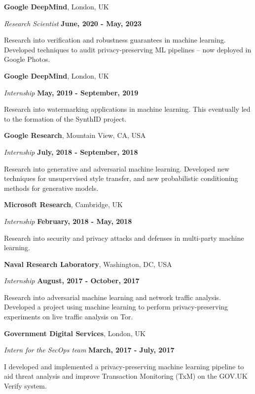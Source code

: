 \documentclass[margin,line]{res}
\begin{document}
\begin{resume}
{\bf Google DeepMind}, London, UK

\vspace{-.3cm}
{\em Research Scientist} \hfill {\bf June, 2020 -  May, 2023}

Research into verification and robustness guarantees in machine learning. Developed techniques to audit privacy-preserving ML pipelines -- now deployed in Google Photos.

{\bf Google DeepMind}, London, UK

\vspace{-.3cm}
{\em Internship} \hfill {\bf May, 2019 - September, 2019}

Research into watermarking applications in machine learning. This eventually led to the formation of the SynthID project.

{\bf Google Research}, Mountain View, CA, USA

\vspace{-.3cm}
{\em Internship} \hfill {\bf July, 2018 - September, 2018}

Research into generative and adversarial machine learning. Developed new techniques for unsupervised style transfer,
and new probabilistic conditioning methods for generative models.

{\bf Microsoft Research}, Cambridge, UK

\vspace{-.3cm}
{\em Internship} \hfill {\bf February, 2018 - May, 2018}

Research into security and privacy attacks and defenses in multi-party machine learning.

{\bf Naval Research Laboratory}, Washington, DC, USA

\vspace{-.3cm}
{\em Internship} \hfill {\bf August, 2017 - October, 2017}

Research into adversarial machine learning and network traffic analysis. Developed a project using machine learning
 to perform privacy-preserving experiments on live traffic analysis on Tor.

{\bf Government Digital Services}, London, UK

\vspace{-.3cm}
{\em Intern for the SecOps team} \hfill {\bf March,
  2017 - July, 2017}

I developed and implemented a privacy-preserving machine learning pipeline to aid threat analysis
and improve Transaction Monitoring (TxM) on the GOV.UK Verify system.


\end{resume}
\end{document}
